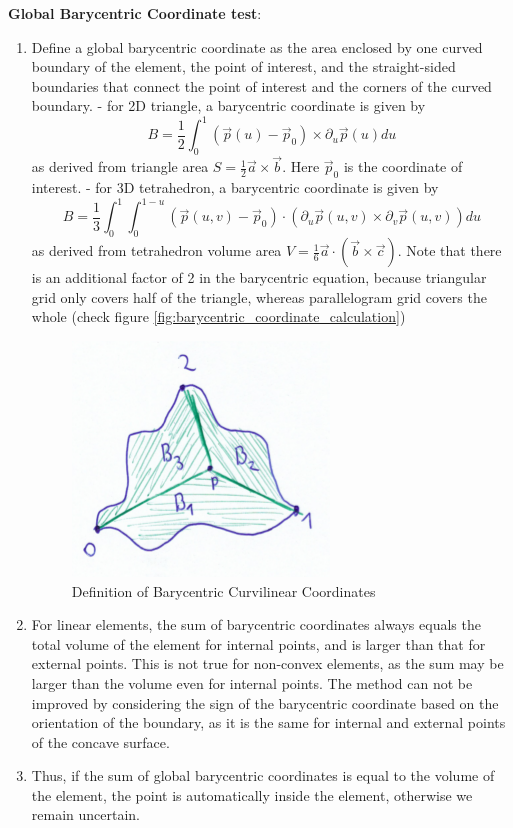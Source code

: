 \noindent
\textbf{Global Barycentric Coordinate test}:
\begin{enumerate}
	\item Define a global barycentric coordinate as the area enclosed by one curved boundary of the element, the point of interest, and the straight-sided boundaries that connect the point of interest and the corners of the curved boundary.
		\subitem - for 2D triangle, a barycentric coordinate is given by
		\[B = \frac{1}{2}\int_0^1 (\vec{p}(u) - \vec{p}_0) \times \partial_u \vec{p}(u) du\]
		as derived from triangle area $S = \frac{1}{2} \vec{a} \times \vec{b}$. Here $\vec{p}_0$ is the coordinate of interest.
		\subitem - for 3D tetrahedron, a barycentric coordinate is given by
		\[B = \frac{1}{3}\int_0^1 \int_0^{1-u} (\vec{p}(u,v) - \vec{p}_0) \cdot (\partial_u \vec{p}(u,v) \times \partial_v \vec{p}(u,v)) du\]
		as derived from tetrahedron volume area $V = \frac{1}{6} \vec{a} \cdot (\vec{b} \times \vec{c})$.
		Note that there is an additional factor of 2 in the barycentric equation, because triangular grid only covers half of the triangle, whereas
		parallelogram grid covers the whole (check figure \ref{fig:barycentric_coordinate_calculation})

\begin{figure}[!htb]
    \centering	
    \includegraphics[scale=0.7]{doc-pics/pic-barycentric-curvilinear-definition.png}
    \caption{Definition of Barycentric Curvilinear Coordinates}
\end{figure}

	\item For linear elements, the sum of barycentric coordinates always equals the total volume of the element for internal points, and is larger than that for external points. This is not true for non-convex elements, as the sum may be larger than the volume even for internal points. The method can not be improved by considering the sign of the barycentric coordinate based on the orientation of the boundary, as it is the same for internal and external points of the concave surface.
	\item Thus, if the sum of global barycentric coordinates is equal to the volume of the element, the point is automatically inside the element, otherwise we remain uncertain.
			
\end{enumerate}

